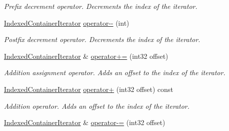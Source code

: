 \begin{DoxyCompactItemize}
\begin{DoxyCompactList}\small\item\em Prefix decrement operator. Decrements the index of the iterator. \end{DoxyCompactList}\item 
\mbox{\label{class_arcana_1_1_indexed_container_iterator_a2ad604565d2e6e855b0bba4c9f657cdf}} 
\mbox{\hyperlink{class_arcana_1_1_indexed_container_iterator}{Indexed\+Container\+Iterator}} \mbox{\hyperlink{class_arcana_1_1_indexed_container_iterator_a2ad604565d2e6e855b0bba4c9f657cdf}{operator-\/-\/}} (int)
\begin{DoxyCompactList}\small\item\em Postfix decrement operator. Decrements the index of the iterator. \end{DoxyCompactList}\item 
\mbox{\label{class_arcana_1_1_indexed_container_iterator_a67ac83c9256b5c09ab56242ef89216ab}} 
\mbox{\hyperlink{class_arcana_1_1_indexed_container_iterator}{Indexed\+Container\+Iterator}} \& \mbox{\hyperlink{class_arcana_1_1_indexed_container_iterator_a67ac83c9256b5c09ab56242ef89216ab}{operator+=}} (int32 offset)
\begin{DoxyCompactList}\small\item\em Addition assignment operator. Adds an offset to the index of the iterator. \end{DoxyCompactList}\item 
\mbox{\label{class_arcana_1_1_indexed_container_iterator_a88855965dd71c21fa2b554d1f15f2485}} 
\mbox{\hyperlink{class_arcana_1_1_indexed_container_iterator}{Indexed\+Container\+Iterator}} \mbox{\hyperlink{class_arcana_1_1_indexed_container_iterator_a88855965dd71c21fa2b554d1f15f2485}{operator+}} (int32 offset) const
\begin{DoxyCompactList}\small\item\em Addition operator. Adds an offset to the index of the iterator. \end{DoxyCompactList}\item 
\mbox{\label{class_arcana_1_1_indexed_container_iterator_aee19f0a97e3595af3fd06e33de5dd1a6}} 
\mbox{\hyperlink{class_arcana_1_1_indexed_container_iterator}{Indexed\+Container\+Iterator}} \& \mbox{\hyperlink{class_arcana_1_1_indexed_container_iterator_aee19f0a97e3595af3fd06e33de5dd1a6}{operator-\/=}} (int32 offset)

\end{DoxyCompactItemize}
